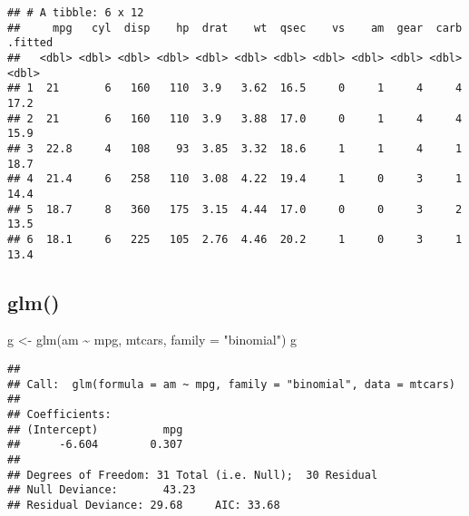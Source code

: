 \documentclass[
]{book}
\newenvironment{Shaded}{\begin{snugshade}}{\end{snugshade}}
\newcommand{\AttributeTok}[1]{\textcolor[rgb]{0.77,0.63,0.00}{#1}}
\newcommand{\DecValTok}[1]{\textcolor[rgb]{0.00,0.00,0.81}{#1}}
\newcommand{\FunctionTok}[1]{\textcolor[rgb]{0.00,0.00,0.00}{#1}}
\newcommand{\NormalTok}[1]{#1}
\newcommand{\OtherTok}[1]{\textcolor[rgb]{0.56,0.35,0.01}{#1}}
\newcommand{\SpecialCharTok}[1]{\textcolor[rgb]{0.00,0.00,0.00}{#1}}
\newcommand{\StringTok}[1]{\textcolor[rgb]{0.31,0.60,0.02}{#1}}
\begin{document}
\begin{Shaded}
\end{Shaded}

\begin{verbatim}
## # A tibble: 6 x 12
##     mpg   cyl  disp    hp  drat    wt  qsec    vs    am  gear  carb .fitted
##   <dbl> <dbl> <dbl> <dbl> <dbl> <dbl> <dbl> <dbl> <dbl> <dbl> <dbl>   <dbl>
## 1  21       6   160   110  3.9   3.62  16.5     0     1     4     4    17.2
## 2  21       6   160   110  3.9   3.88  17.0     0     1     4     4    15.9
## 3  22.8     4   108    93  3.85  3.32  18.6     1     1     4     1    18.7
## 4  21.4     6   258   110  3.08  4.22  19.4     1     0     3     1    14.4
## 5  18.7     8   360   175  3.15  4.44  17.0     0     0     3     2    13.5
## 6  18.1     6   225   105  2.76  4.46  20.2     1     0     3     1    13.4
\end{verbatim}

\hypertarget{glm}{%
\subsection{glm()}\label{glm}}

\begin{Shaded}
\begin{Highlighting}[]
\NormalTok{g }\OtherTok{\textless{}{-}} \FunctionTok{glm}\NormalTok{(am }\SpecialCharTok{\textasciitilde{}}\NormalTok{ mpg, mtcars, }\AttributeTok{family =} \StringTok{"binomial"}\NormalTok{)}
\NormalTok{g}
\end{Highlighting}
\end{Shaded}

\begin{verbatim}
## 
## Call:  glm(formula = am ~ mpg, family = "binomial", data = mtcars)
## 
## Coefficients:
## (Intercept)          mpg  
##      -6.604        0.307  
## 
## Degrees of Freedom: 31 Total (i.e. Null);  30 Residual
## Null Deviance:       43.23 
## Residual Deviance: 29.68     AIC: 33.68
\end{verbatim}
\end{document}
